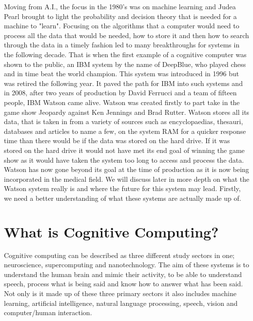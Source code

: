 \documentclass[journal]{IEEEtran}
\begin{document}
Moving from A.I., the focus in the 1980's was on machine learning and Judea Pearl brought to light the probability and decision theory that is needed for a machine to "learn"\cite{judea}. Focusing on the algorithms that a computer would need to process all the data that would be needed, how to store it and then how to search through the data in a timely fashion led to many breakthroughs for systems in the following decade. That is when the first example of a cognitive computer was shown to the public, an IBM system by the name of DeepBlue, who played chess and in time beat the world champion\cite{DeepBlue}. This system was introduced in 1996 but was retired the following year. It paved the path for IBM into such systems and in 2008, after two years of production by David Ferrucci and a team of fifteen people, IBM Watson came alive. Watson was created firstly to part take in the game show Jeopardy against Ken Jennings and Brad Rutter. Watson stores all its data, that is taken in from a variety of sources such as encyclopaedias, thesauri, databases and articles to name a few, on the system RAM for a quicker response time than there would be if the data was stored on the hard drive. If it was stored on the hard drive it would not have met its end goal of winning the game show as it would have taken the system too long to access and process the data. Watson has now gone beyond its goal at the time of production as it is now being incorporated in the medical field. We will discuss later in more depth on what the Watson system really is and where the future for this system may lead. Firstly, we need a better understanding of what these systems are actually made up of.


\section{What is Cognitive Computing?}
Cognitive computing can be described as three different study sectors in one; neuroscience, supercomputing and nanotechnology\cite{whatiscc}. The aim of these systems is to understand the human brain and mimic their activity, to be able to understand speech, process what is being said and know how to answer what has been said. Not only is it made up of these three primary sectors it also includes machine learning, artificial intelligence, natural language processing, speech, vision and computer/human interaction.
\end{document}
